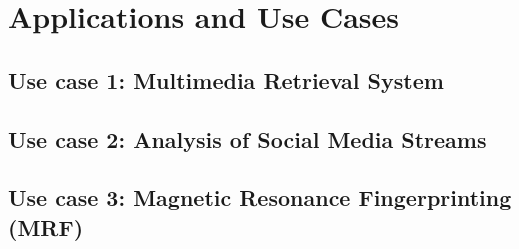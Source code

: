 \chapter{Applications and Use Cases}
\label{chapter:applications}

\section{Use case 1: Multimedia Retrieval System}

\section{Use case 2: Analysis of Social Media Streams}

\section{Use case 3: Magnetic Resonance Fingerprinting (MRF)}